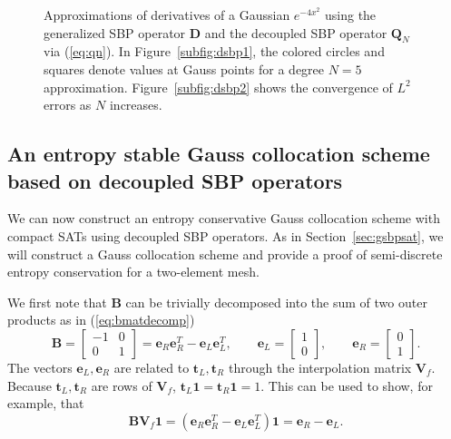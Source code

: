 \documentclass[review,onefignum,onetabnum,final]{siamart171218}
\newcommand{\LRp}[1]{\left( #1 \right)}
\begin{document}
\begin{figure}
{

}

\caption{Approximations of derivatives of a Gaussian $e^{-4x^2}$ using the generalized SBP operator $\bm{D}$ and the decoupled SBP operator $\bm{Q}_N$ via (\ref{eq:qn}).  In Figure~\ref{subfig:dsbp1}, the colored circles and squares denote values at Gauss points for a degree $N = 5$ approximation.  Figure~\ref{subfig:dsbp2} shows the convergence of $L^2$ errors as $N$ increases. }
\label{fig:dsbpcorrect}
\end{figure}


\subsection{An entropy stable Gauss collocation scheme based on decoupled SBP operators}

We can now construct an entropy conservative Gauss collocation scheme with compact SATs using decoupled SBP operators.  As in Section~\ref{sec:gsbpsat}, we will construct a Gauss collocation scheme and provide a proof of semi-discrete entropy conservation for a two-element mesh.  

We first note that $\bm{B}$ can be trivially decomposed into the sum of two outer products as in (\ref{eq:bmatdecomp})
\begin{equation}
\bm{B} = \begin{bmatrix}
-1 & 0 \\
0 & 1
\end{bmatrix} = \bm{e}_R\bm{e}_R^T - \bm{e}_L\bm{e}_L^T, \qquad \bm{e}_L = \begin{bmatrix} 1\\0\end{bmatrix}, \qquad \bm{e}_R = \begin{bmatrix} 0\\1\end{bmatrix}.
\label{eq:bmatdecomp2}
\end{equation}
The vectors $\bm{e}_L, \bm{e}_R$ are related to $\bm{t}_L, \bm{t}_R$ through the interpolation matrix $\bm{V}_f$.  Because $\bm{t}_L, \bm{t}_R$ are rows of $\bm{V}_f$, $\bm{t}_L\bm{1} = \bm{t}_R\bm{1} = 1$.  This can be used to show, for example, that
\begin{equation}
\label{eq:et}
\bm{B}\bm{V}_f\bm{1} = \LRp{\bm{e}_R\bm{e}_R^T - \bm{e}_L\bm{e}_L^T}\bm{1} = \bm{e}_R-\bm{e}_L.
\end{equation}
\end{document}
